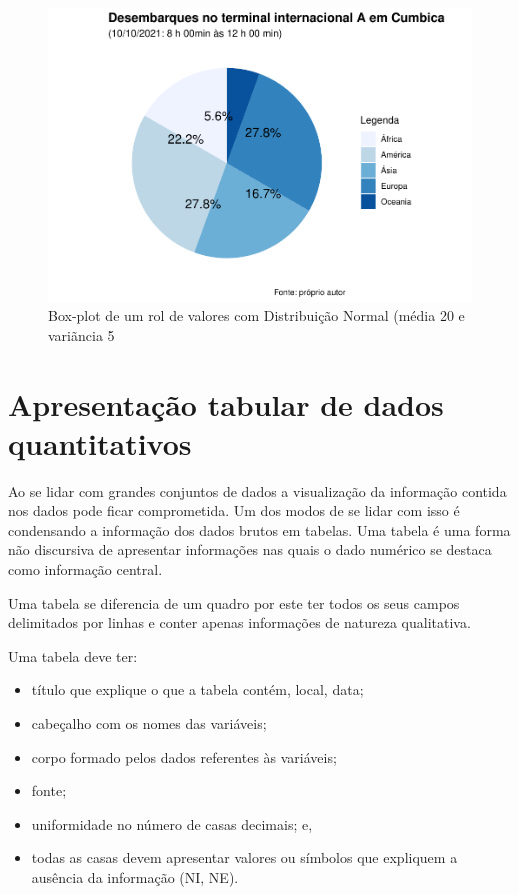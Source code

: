 \documentclass[
]{book}
\providecommand{\tightlist}{%
  \setlength{\itemsep}{0pt}\setlength{\parskip}{0pt}}
\begin{document}
\begin{figure}

{\centering \includegraphics{apostila_files/figure-latex/unnamed-chunk-54-1} 

}

\caption{Box-plot de um rol de valores com Distribuição Normal (média 20 e variãncia 5}\label{fig:unnamed-chunk-54}
\end{figure}

\hypertarget{apresentauxe7uxe3o-tabular-de-dados-quantitativos}{%
\section{Apresentação tabular de dados quantitativos}\label{apresentauxe7uxe3o-tabular-de-dados-quantitativos}}

Ao se lidar com grandes conjuntos de dados a visualização da informação contida nos dados pode ficar comprometida. Um dos modos de se lidar com isso é condensando a informação dos dados brutos em tabelas. Uma tabela é uma forma não discursiva de apresentar informações nas quais o dado numérico se destaca como informação central.

Uma tabela se diferencia de um quadro por este ter todos os seus campos delimitados por linhas e conter apenas informações de natureza qualitativa.

Uma tabela deve ter:

\begin{itemize}
\tightlist
\item
  título que explique o que a tabela contém, local, data;
\item
  cabeçalho com os nomes das variáveis;
\item
  corpo formado pelos dados referentes às variáveis;
\item
  fonte;
\item
  uniformidade no número de casas decimais; e,
\item
  todas as casas devem apresentar valores ou símbolos que expliquem a ausência da informação (NI, NE).
\end{itemize}
\end{document}
